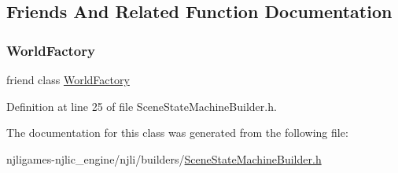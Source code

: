 \subsection{Friends And Related Function Documentation}
\mbox{\label{classnjli_1_1_scene_state_machine_builder_acb96ebb09abe8f2a37a915a842babfac}} 
\subsubsection{\texorpdfstring{World\+Factory}{WorldFactory}}
{\footnotesize\ttfamily friend class \mbox{\hyperlink{classnjli_1_1_world_factory}{World\+Factory}}\hspace{0.3cm}{\ttfamily [friend]}}



Definition at line 25 of file Scene\+State\+Machine\+Builder.\+h.



The documentation for this class was generated from the following file\+:\begin{DoxyCompactItemize}
\item 
njligames-\/njlic\+\_\+engine/njli/builders/\mbox{\hyperlink{_scene_state_machine_builder_8h}{Scene\+State\+Machine\+Builder.\+h}}\end{DoxyCompactItemize}
